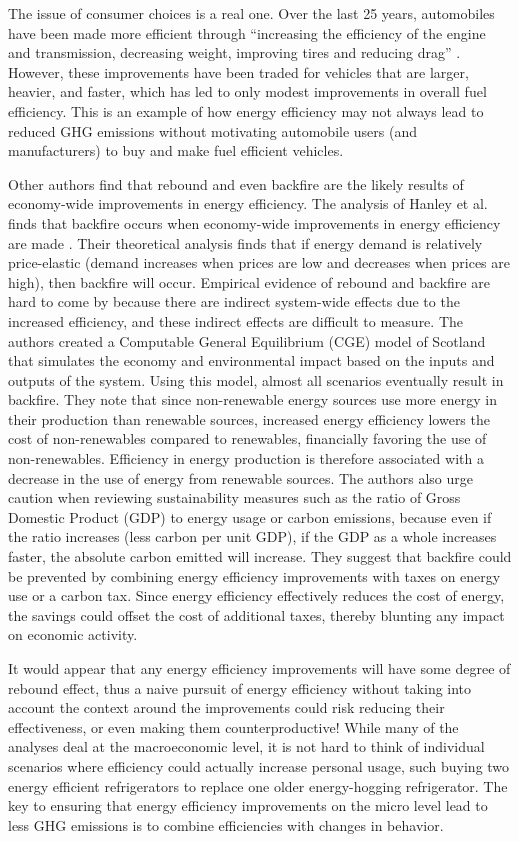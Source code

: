 The issue of consumer choices is a real one. Over the last 25 years, automobiles have been made more efficient through ``increasing the efficiency of the engine and transmission, decreasing weight, improving tires and reducing drag'' \cite{Heywood2008Fueling-Our-Future}. However, these improvements have been traded for vehicles that are larger, heavier, and faster, which has led to only modest improvements in overall fuel efficiency. This is an example of how energy efficiency may not always lead to reduced GHG emissions without motivating automobile users (and manufacturers) to buy and make fuel efficient vehicles.

Other authors find that rebound and even backfire are the likely results of economy-wide improvements in energy efficiency. The analysis of Hanley et al. finds that backfire occurs when economy-wide improvements in energy efficiency are made \cite{Hanley2008Do-increases-in}. Their theoretical analysis finds that if energy demand is relatively price-elastic (demand increases when prices are low and decreases when prices are high), then backfire will occur. Empirical evidence of rebound and backfire are hard to come by because there are indirect system-wide effects due to the increased efficiency, and these indirect effects are difficult to measure. The authors created a Computable General Equilibrium (CGE) model of Scotland that simulates the economy and environmental impact based on the inputs and outputs of the system. Using this model, almost all scenarios eventually result in backfire. They note that since non-renewable energy sources use more energy in their production than renewable sources, increased energy efficiency lowers the cost of non-renewables compared to renewables, financially favoring the use of non-renewables. Efficiency in energy production is therefore associated with a decrease in the use of energy from renewable sources. The authors also urge caution when reviewing sustainability measures such as the ratio of Gross Domestic Product (GDP) to energy usage or carbon emissions, because even if the ratio increases (less carbon per unit GDP), if the GDP as a whole increases faster, the absolute carbon emitted will increase. They suggest that backfire could be prevented by combining energy efficiency improvements with taxes on energy use or a carbon tax. Since energy efficiency effectively reduces the cost of energy, the savings could offset the cost of additional taxes, thereby blunting any impact on economic activity.

It would appear that any energy efficiency improvements will have some degree of rebound effect, thus a naive pursuit of energy efficiency without taking into account the context around the improvements could risk reducing their effectiveness, or even making them counterproductive! While many of the analyses deal at the macroeconomic level, it is not hard to think of individual scenarios where efficiency could actually increase personal usage, such buying two energy efficient refrigerators to replace one older energy-hogging refrigerator. The key to ensuring that energy efficiency improvements on the micro level lead to less GHG emissions is to combine efficiencies with changes in behavior.

